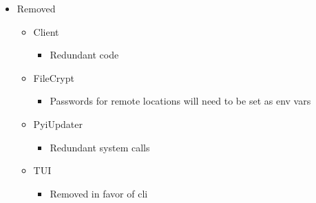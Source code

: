 \documentclass[letterpaper,10pt,english]{sphinxmanual}
\begin{document}
\begin{itemize}
\begin{itemize}
\begin{itemize}
\end{itemize}

\end{itemize}

\item {} 
Removed
\begin{itemize}
\item {} 
Client
\begin{itemize}
\item {} 
Redundant code

\end{itemize}

\item {} 
FileCrypt
\begin{itemize}
\item {} 
Passwords for remote locations will need to be set as env vars

\end{itemize}

\item {} 
PyiUpdater
\begin{itemize}
\item {} 
Redundant system calls

\end{itemize}

\item {} 
TUI
\begin{itemize}
\item {} 
Removed in favor of cli

\end{itemize}

\end{itemize}

\end{itemize}
\end{document}
